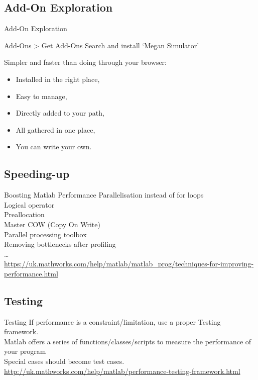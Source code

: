 \documentclass[]{beamer} %
\begin{document}
\subsection{Add-On Exploration}
\begin{frame}{Add-On Exploration}
\begin{block}{Add-Ons > Get Add-Ons}
Search and install `Megan Simulator'
\end{block}
\pause
\begin{block}{Simpler and faster than doing through your browser:}
\begin{itemize}
\item[\cg] Installed in the right place,
\item[\cg] Easy to manage, 
\item[\cg] Directly added to your path,
\item[\cg] All gathered in one place,
\item[\cg] You can write your own.
\end{itemize}
\end{block}
\end{frame}




\subsection{Speeding-up}
\begin{frame}{Boosting Matlab Performance}
Parallelisation instead of  for loops\\
Logical operator\\
Preallocation\\
Master COW (Copy On Write)\\
Parallel processing toolbox\\
Removing bottlenecks after profiling\\
\dots\\
\url{https://uk.mathworks.com/help/matlab/matlab_prog/techniques-for-improving-performance.html}
\end{frame}


\subsection{Testing}
\begin{frame}{Testing}
If performance is a constraint/limitation, use a proper Testing framework.\\
Matlab offers a series of functions/classes/scripts to measure the performance of your program\\[3mm]
Special cases should become test cases.\\
{\tiny{\url{http://uk.mathworks.com/help/matlab/performance-testing-framework.html}}}
\end{frame}
\end{document}
